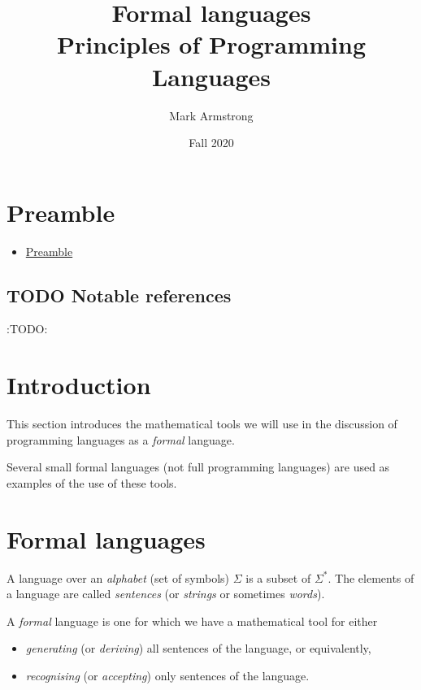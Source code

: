 \documentclass[11pt]{article}
\author{Mark Armstrong}
\date{Fall 2020}
\title{Formal languages\\\medskip
\large Principles of Programming Languages}
\theoremstyle{definition}
\begin{document}
\maketitle

\section{Preamble}
\label{sec:orge3363ee}

\begin{scriptsize}
\begin{itemize}
\item \hyperref[sec:orge3363ee]{Preamble}
\end{itemize}
\end{scriptsize}

\subsection{{\bfseries\sffamily TODO} Notable references}
\label{sec:org70de22e}

:TODO:

\section{Introduction}
\label{sec:org3ff09db}

This section introduces the mathematical tools
we will use in the discussion of programming languages
as a \emph{formal} language.

Several small formal languages (not full programming languages)
are used as examples of the use of these tools.

\section{Formal languages}
\label{sec:org8f0039e}

A language over an \emph{alphabet} (set of symbols) \(Σ\)
is a subset of \(Σ^{*}\).
The elements of a language are called \emph{sentences}
(or \emph{strings} or sometimes \emph{words}).

A \emph{formal} language is one for which we have a mathematical tool
for either
\begin{itemize}
\item \emph{generating} (or \emph{deriving}) all sentences of the language,
or equivalently,
\item \emph{recognising} (or \emph{accepting}) only sentences of the language.
\end{itemize}
\end{document}

